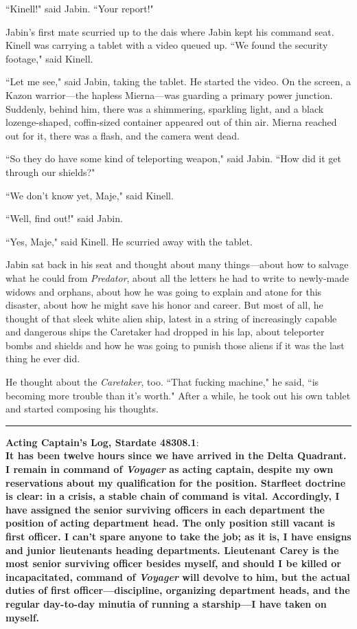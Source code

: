 \documentclass[twoside,letterpaper,12pt]{memoir}
\begin{document}
``Kinell!" said Jabin. ``Your report!"

Jabin's first mate scurried up to the dais where Jabin kept his command seat. Kinell was carrying a tablet with a video queued up. ``We found the security footage," said Kinell.

``Let me see," said Jabin, taking the tablet. He started the video. On the screen, a Kazon warrior---the hapless Mierna---was guarding a primary power junction. Suddenly, behind him, there was a shimmering, sparkling light, and a black lozenge-shaped, coffin-sized container appeared out of thin air. Mierna reached out for it, there was a flash, and the camera went dead.

``So they do have some kind of teleporting weapon," said Jabin. ``How did it get through our shields?"

``We don't know yet, Maje," said Kinell.

``Well, find out!" said Jabin.

``Yes, Maje," said Kinell. He scurried away with the tablet.

Jabin sat back in his seat and thought about many things---about how to salvage what he could from \textit{Predator}, about all the letters he had to write to newly-made widows and orphans, about how he was going to explain and atone for this disaster, about how he might save his honor and career. But most of all, he thought of that sleek white alien ship, latest in a string of increasingly capable and dangerous ships the Caretaker had dropped in his lap, about teleporter bombs and shields and how he was going to punish those aliens if it was the last thing he ever did.

He thought about the \textit{Caretaker}, too. ``That fucking machine," he said, ``is becoming more trouble than it's worth." After a while, he took out his own tablet and started composing his thoughts.

\begin{center}\rule{3cm}{0.4 pt}\end{center}

\noindent\textbf{Acting Captain's Log, Stardate 48308.1}:\\

\textbf{It has been twelve hours since we have arrived in the Delta Quadrant. I remain in command of \textit{Voyager} as acting captain, despite my own reservations about my qualification for the position. Starfleet doctrine is clear: in a crisis, a stable chain of command is vital. Accordingly, I have assigned the senior surviving officers in each department the position of acting department head. The only position still vacant is first officer. I can't spare anyone to take the job; as it is, I have ensigns and junior lieutenants heading departments. Lieutenant Carey is the most senior surviving officer besides myself, and should I be killed or incapacitated, command of \textit{Voyager} will devolve to him, but the actual duties of first officer---discipline, organizing department heads, and the regular day-to-day minutia of running a starship---I have taken on myself.}
\end{document}

